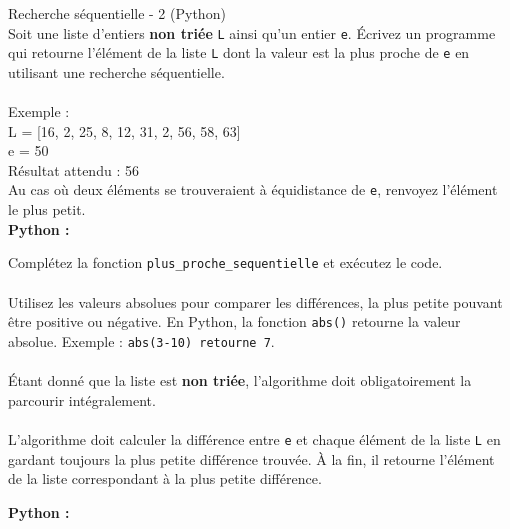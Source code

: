     \begin{Exercice}[10 minutes] Recherche séquentielle - 2 (Python)\\
    
    Soit une liste d’entiers \textbf{non triée} \lstinline{L} ainsi qu’un entier \lstinline{e}. Écrivez un programme qui retourne l'élément de la liste \lstinline{L} dont la valeur est la plus proche de \lstinline{e} en utilisant une recherche séquentielle.\\\\
    Exemple :\\
    L = [16, 2, 25, 8, 12, 31, 2, 56, 58, 63]\\
    e = 50\\
    Résultat attendu : 56\\
    
    Au cas où deux éléments se trouveraient à équidistance de \lstinline{e}, renvoyez l'élément le plus petit.\\
    
    \textbf{Python :}
        
        \begin{conseil}
            Complétez la fonction \lstinline{plus_proche_sequentielle} et exécutez le code.\\\\
            Utilisez les valeurs absolues pour comparer les différences, la plus petite pouvant être positive ou négative. En Python, la fonction \lstinline{abs()} retourne la valeur absolue. Exemple : \lstinline{abs(3-10) retourne 7}.\\\\
            Étant donné que la liste est \textbf{non triée}, l'algorithme doit obligatoirement la parcourir intégralement.\\\\
            L'algorithme doit calculer la différence entre \lstinline{e} et chaque élément de la liste \lstinline{L} en gardant toujours la plus petite différence trouvée. À la fin, il retourne l'élément de la liste correspondant à la plus petite différence.  
        \end{conseil}
        
        \begin{solution}
        \textbf{Python :}
            
            
        \end{solution}
        
    \end{Exercice}
    
